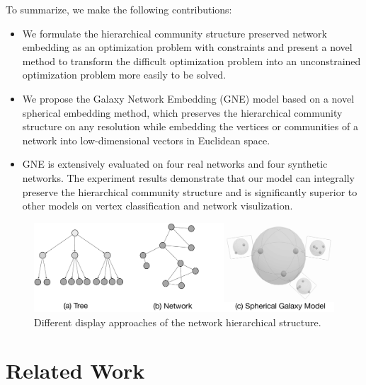\documentclass{article}
\theoremstyle{definition}
\begin{document}
		To summarize, we make the following contributions:
		\begin{itemize}
		\item{
		We formulate the hierarchical community structure preserved network embedding as an optimization problem with constraints and present a novel method to transform the difficult optimization problem into an unconstrained optimization problem more easily to be solved.
		}
		\item{
		We propose the Galaxy Network Embedding (GNE) model based on a novel spherical embedding method, which preserves the hierarchical community structure on any resolution while embedding the vertices or communities of a network into low-dimensional vectors in Euclidean space.
		}
		\item{
		GNE is extensively evaluated on four real networks and four synthetic networks. The experiment results demonstrate that our model can integrally preserve the hierarchical community structure and is significantly superior to other models on vertex classification and network visulization.  
		}
		\end{itemize}
		
		
		\begin{figure}
			\includegraphics[width=1.0\linewidth]{figure/Galaxy.pdf}
			\caption{Different display approaches of the network hierarchical structure.}
			\label{fig:intuition}
		\end{figure}

\section{Related Work}
	
\end{document}
